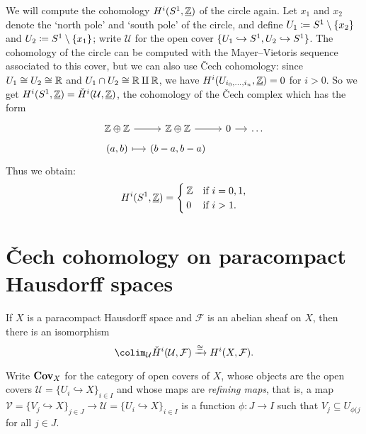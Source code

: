 \begin{exmp}
We will compute the cohomology \(H^i(\sphere[1],\underline{\bb Z})\) of the circle again.
Let \(x_1\) and \(x_2\) denote the `north pole' and `south pole' of the circle, and define \(U_1\coloneq\sphere[1]\setminus\{x_2\}\) and \(U_2\coloneq\sphere[1]\setminus\{x_1\}\); write \(\mathcal U\) for the open cover \(\{U_1\hookrightarrow\sphere[1],U_2\hookrightarrow\sphere[1]\}\).
The cohomology of the circle can be computed with the Mayer--Vietoris sequence associated to this cover, but we can also use Čech cohomology: since \(U_1\cong U_2\cong\mathbb{R}\) and \(U_1\cap U_2\cong\mathbb{R}\amalg\mathbb{R}\), we have \(H^i(U_{i_0,\ldots,i_n},\underline{\mathbb{Z}})=0\) for \(i>0\).
So we get \(H^i(\sphere[1],\underline{\bb Z}) = \check{H}^i(\mathcal U,\underline{\bb Z})\), the cohomology of the Čech complex which has the form
\begin{equation*}
  \begin{tikzcd}[row sep=tiny, column sep=small]
    \bb Z\oplus\bb Z \ar[r] & \bb Z\oplus\bb Z \ar[r] & 0 \ar[r] & \ldots \\
    {(a,b)} \ar[r, mapsto] & {(b-a,b-a)}
  \end{tikzcd}
\end{equation*}
Thus we obtain:
\[ H^i(\sphere[1],\underline{\bb Z}) =
  \begin{cases}
    \bb Z & \text{if } i = 0,1\text{,} \\
    0 & \text{if } i > 1\text{.}
  \end{cases}
\]
\end{exmp}

\section{Čech cohomology on paracompact Hausdorff spaces}

\begin{thm}
If \(X\) is a paracompact Hausdorff space and \(\mathcal F\) is an abelian sheaf on \(X\), then there is an isomorphism
\[ \colim_{\mathcal U}\check{H}^i(\mathcal U,\mathcal F) \xrightarrow{\cong} H^i(X,\mathcal F)\text{.} \]
\end{thm}

\begin{defn}
Write \(\mathbf{Cov}_{X}\) for the category of open covers of \(X\), whose objects are the open covers \(\mathcal U=\{U_i\hookrightarrow X\}_{i\in I}\) and whose maps are \emph{refining maps}, that is, a map \(\mathcal V=\{V_j\hookrightarrow X\}_{j\in J}\to\mathcal U=\{U_i\hookrightarrow X\}_{i\in I}\) is a function \(\phi\colon J\to I\) such that \(V_j\subseteq U_{\phi(j}\) for all \(j\in J\).
\end{defn}

